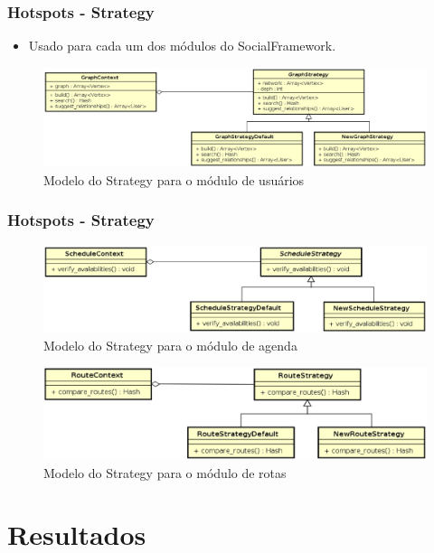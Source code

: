 \documentclass{beamer}
\begin{document}
\begin{frame}
\frametitle{Hotspots - Strategy}

\begin{itemize}
	\item Usado para cada um dos módulos do SocialFramework.
\end{itemize}

\begin{figure}[h]
	\centering
	\includegraphics[scale=0.25]{figuras/graph_strategy.eps}
	\caption{Modelo do Strategy para o módulo de usuários}
\end{figure}

\end{frame}

\begin{frame}
\frametitle{Hotspots - Strategy}

\begin{figure}[h]
	\centering
	\includegraphics[scale=0.25]{figuras/schedule_strategy.eps}
	\caption{Modelo do Strategy para o módulo de agenda}
\end{figure}

\begin{figure}[h]
	\centering
	\includegraphics[scale=0.25]{figuras/route_strategy.eps}
	\caption{Modelo do Strategy para o módulo de rotas}
\end{figure}

\end{frame}

\section{Resultados}
\end{document}

